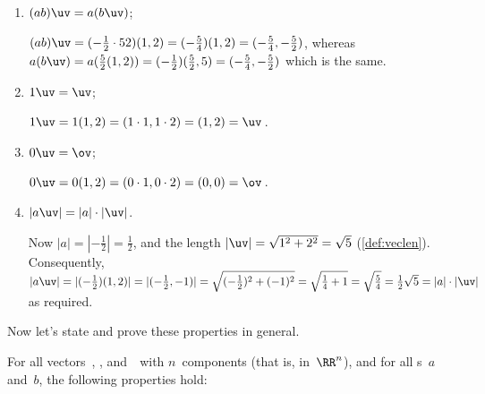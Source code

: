 \begin{example}
\begin{enumerate}
\item \((ab)\uv=a(b\uv)\);
\begin{solution} 
\((ab)\uv=(-\tfrac12\cdot52)(1,2)=(-\tfrac54)(1,2) =(-\tfrac54,-\tfrac52)\), whereas \(a(b\uv)=a(\tfrac52(1,2)) =(-\tfrac12)(\tfrac52,5) =(-\tfrac54,-\tfrac52)\) which is the same.
\end{solution}

\item \(1\uv=\uv\);
\begin{solution} 
\(1\uv=1(1,2)=(1\cdot1,1\cdot2)=(1,2)=\uv\)\,. 
\end{solution}

\item \(0\uv=\ov\);
\begin{solution} 
\(0\uv=0(1,2)=(0\cdot1,0\cdot2)=(0,0)=\ov\)\,. 
\end{solution}

\item \(|a\uv|=|a|\cdot|\uv|\).
\begin{solution} 
Now \(|a|=|-\tfrac12|=\tfrac12\), and the length \(|\uv|=\sqrt{1^2+2^2}=\sqrt5\) (\cref{def:veclen}).
Consequently, \(|a\uv| =|(-\tfrac12)(1,2)| =|(-\tfrac12,-1)| =\sqrt{(-\tfrac12)^2+(-1)^2} =\sqrt{\tfrac14+1} =\sqrt{\tfrac54} =\tfrac12\sqrt5=|a|\cdot|\uv|\) as required.
\end{solution}

\end{enumerate}
\end{example}


Now let's state and prove these properties in general.


\begin{theorem} \label{thm:vecops}
For all vectors~\uv, \vv, and~\wv\  with \(n\)~components (that is, in~\(\RR^n\)), and for all s~\(a\) and~\(b\),
the following properties hold:
\end{theorem}

